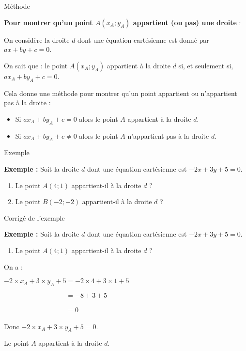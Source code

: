 \documentclass[12pt]{beamer}
\begin{document}
\begin{frame}{Méthode}

\textbf{Pour montrer qu'un point $A(x_A;y_A)$ appartient (ou pas) une droite} :

\bigskip

On considère la droite $d$ dont une équation cartésienne est donné par $ax + by + c = 0$.

\medskip

On sait que : le point $A(x_A ; y_A)$ appartient à la droite $d$ si, et seulement si, $ax_A + by_A + c = 0$. 

\bigskip

Cela donne une méthode pour montrer qu'un point appartient ou n'appartient pas à la droite :

\begin{itemize}
\item Si $ax_A + by_A + c = 0$ alors le point $A$ appartient à la droite $d$.
\item Si $ax_A + by_A + c \neq 0$ alors le point $A$ n'appartient pas à la droite $d$.
\end{itemize}

\end{frame}

\begin{frame}{Exemple}

\textbf{Exemple :} Soit la droite $d$ dont une équation cartésienne est $-2x+3y + 5 = 0$.

\medskip

\begin{enumerate}
\item Le point $A(4;1)$ appartient-il à la droite $d$ ?
\item Le point $B(-2;-2)$ appartient-il à la droite $d$ ?
\end{enumerate}

\end{frame}

\begin{frame}{Corrigé de l'exemple}

\textbf{Exemple :} Soit la droite $d$ dont une équation cartésienne est $-2x+3y + 5 = 0$.

\medskip

\begin{enumerate}
\setcounter{enumi}{0}
\item Le point $A(4;1)$ appartient-il à la droite $d$ ?
\end{enumerate}

On a : 

\medskip

$-2 \times x_A + 3 \times y_A + 5 = -2 \times 4 + 3 \times 1 + 5$ \par 
$\phantom{-2 \times x_A + 3 \times y_A + 5} = -8 + 3 + 5$ \par 
$\phantom{-2 \times x_A + 3 \times y_A + 5} = 0$

\bigskip

Donc $-2 \times x_A + 3 \times y_A + 5 = 0$. 

\medskip

Le point $A$ appartient à la droite $d$.
\end{frame}
\end{document}

